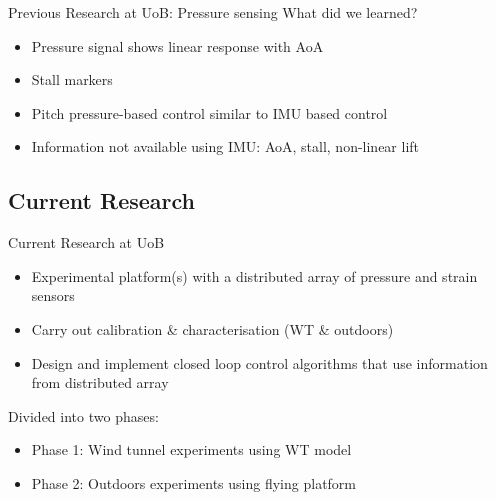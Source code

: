 \documentclass[aspectratio=169]{beamer}            %
\begin{document}
\begin{frame}{Previous Research at UoB: Pressure sensing}
  What did we learned?
	\pause
    \begin{itemize}[<+->]
      \item Pressure signal shows linear response with AoA
      \item Stall markers
      \item Pitch pressure-based control similar to IMU based control
			\item Information not available using IMU: AoA, stall, non-linear lift
    \end{itemize}
\end{frame}

\subsection[Current Research]{Current Research}

\begin{frame}{Current Research at UoB}

  \pause
	\begin{itemize}[<+->]
    \item Experimental platform(s) with a distributed array of pressure and strain sensors
    \item Carry out calibration \& characterisation (WT \& outdoors)
    \item Design and implement closed loop control algorithms that use information from distributed array
  \end{itemize}
	\pause
  Divided into two phases:
	\pause
  \begin{itemize}[<+->]
    \item Phase 1: Wind tunnel experiments using WT model
    \item Phase 2: Outdoors experiments using flying platform
  \end{itemize}
  
\end{frame}
\end{document}
